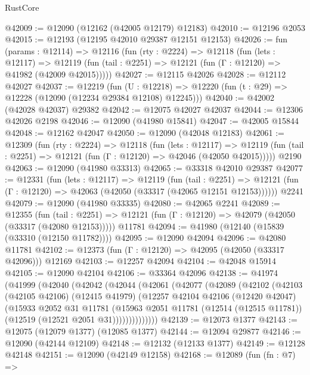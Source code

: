 \begin{lexlean}{RustCore}
\begin{coremodule}
@42009 := @12090 (@12162 (@42005 @12179) @12183)
@42010 := @12196 @2053
@42015 := @12193 (@12195 @42010 @29387 @12151 @12153)
@42026 := fun (params : @12114) =>
  @12116
    (fun (rty : @2224) =>
    @12118
      (fun (lets : @12117) =>
      @12119 (fun (tail : @2251) => @12121 (fun (Γ : @12120) => @41982 (@42009 @42015)))))
@42027 := @12115 @42026
@42028 := @12112 @42027
@42037 := @12219
    (fun (U : @12218) => @12220 (fun (t : @29) => @12228 (@12090 (@12234 @29384 @12108) @12245)))
@42040 := @42002 (@42028 @42037) @29382
@42042 := @12075 @42027 @42037
@42044 := @12306 @42026 @2198
@42046 := @12090 (@41980 @15841)
@42047 := @42005 @15844
@42048 := @12162 @42047
@42050 := @12090 (@42048 @12183)
@42061 := @12309
    (fun (rty : @2224) =>
    @12118
      (fun (lets : @12117) =>
      @12119 (fun (tail : @2251) => @12121 (fun (Γ : @12120) => @42046 (@42050 @42015)))))
    @2190
@42063 := @12090 (@41980 @33313)
@42065 := @33318 @42010 @29387
@42077 := @12331
    (fun (lets : @12117) =>
    @12119
      (fun (tail : @2251) =>
      @12121 (fun (Γ : @12120) => @42063 (@42050 (@33317 (@42065 @12151 @12153))))))
    @2241
@42079 := @12090 (@41980 @33335)
@42080 := @42065 @2241
@42089 := @12355
    (fun (tail : @2251) => @12121 (fun (Γ : @12120) => @42079 (@42050 (@33317 (@42080 @12153)))))
    @11781
@42094 := @41980 (@12140 (@15839 (@33310 (@12150 @11782))))
@42095 := @12090 @42094
@42096 := @42080 @11781
@42102 := @12373 (fun (Γ : @12120) => @42095 (@42050 (@33317 @42096))) @12169
@42103 := @12257 @42094
@42104 := @42048 @15914
@42105 := @12090 @42104
@42106 := @33364 @42096
@42138 := @41974
    (@41999
      (@42040
        (@42042
          (@42044
            (@42061
              (@42077
                (@42089
                  (@42102
                    (@42103
                      (@42105 @42106)
                      (@12415 @41979)
                      (@12257
                        @42104
                        @42106
                        (@12420 @42047)
                        (@15933
                          @2052
                          @31
                          @11781
                          (@15963
                            @2051
                            @11781
                            (@12514 (@12515 @11781))
                            (@12519 (@12521 @2051 @31))))))))))))))
@42139 := @12073 @1377
@42143 := @12075 (@12079 @1377) (@12085 @1377)
@42144 := @12094 @29877
@42146 := @12090 (@42144 @12109)
@42148 := @12132 (@12133 @1377)
@42149 := @12128 @42148
@42151 := @12090 (@42149 @12158)
@42168 := @12089
    (fun (fn : @7) =>

\end{coremodule}
\end{lexlean}
